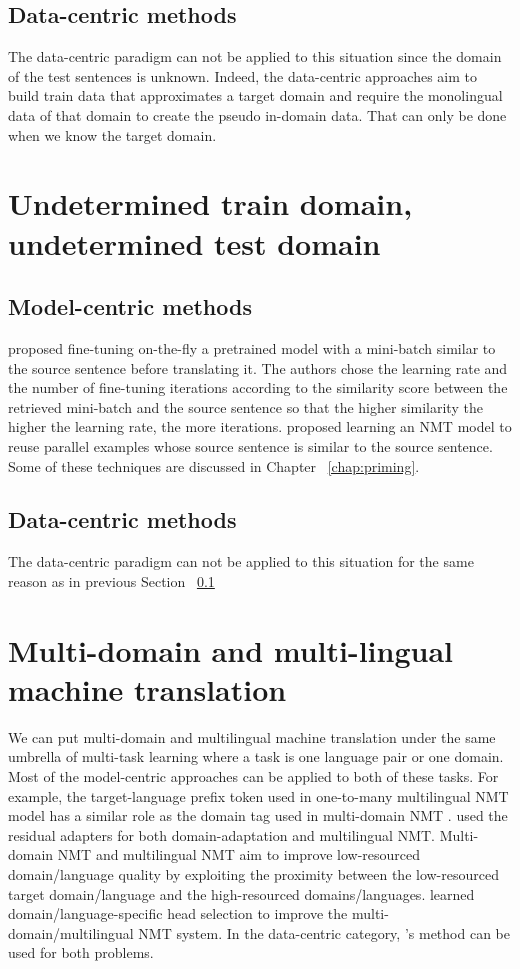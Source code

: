 \subsection{Data-centric methods} \label{ssec:data-centric}
The data-centric paradigm can not be applied to this situation since the domain of the test sentences is unknown. Indeed, the data-centric approaches aim to build train data that approximates a target domain and require the monolingual data of that domain to create the pseudo in-domain data. That can only be done when we know the target domain.
\section{Undetermined train domain, undetermined test domain}
\label{sec:case4}
\subsection{Model-centric methods}
\citet{Farajian17multidomain,Li18onesentence} proposed fine-tuning on-the-fly a pretrained model with a mini-batch similar to the source sentence before translating it. The authors chose the learning rate and the number of fine-tuning iterations according to the similarity score between the retrieved mini-batch and the source sentence so that the higher similarity the higher the learning rate, the more iterations. \citet{bulte19neural,bapna19non,Pham20Priming,xu20boosting} proposed learning an NMT model to reuse parallel examples whose source sentence is similar to the source sentence. Some of these techniques are discussed in Chapter ~\ref{chap:priming}.
\subsection{Data-centric methods}
The data-centric paradigm can not be applied to this situation for the same reason as in previous Section ~\ref{ssec:data-centric}

\section{Multi-domain and multi-lingual machine translation}
We can put multi-domain and multilingual machine translation under the same umbrella of multi-task learning where a task is one language pair or one domain. Most of the model-centric approaches can be applied to both of these tasks. For example, the target-language prefix token used in one-to-many multilingual NMT model \citep{Johnson17google,Aharoni19massively} has a similar role as the domain tag used in multi-domain NMT \citep{Kobus17domain}. \citet{Bapna19simple} used the residual adapters for both domain-adaptation and multilingual NMT. Multi-domain NMT and multilingual NMT aim to improve low-resourced domain/language quality by exploiting the proximity between the low-resourced target domain/language and the high-resourced domains/languages. \citet{Gong21pay} learned domain/language-specific head selection to improve the multi-domain/multilingual NMT system. In the data-centric category, \cite{Wang20balancing}'s method can be used for both problems.

